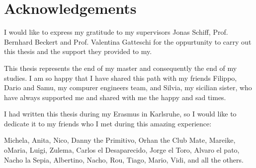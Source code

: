 \chapter* {Acknowledgements}
I would like to express my gratitude to my supervisors Jonas Schiff, Prof. Bernhard Beckert and Prof. Valentina Gatteschi
for the oppurtunity to carry out this thesis and the support they provided to my.

This thesis represents the end of my master and consequently the end of my studies. 
I am so happy that I have shared this path with my friends Filippo, Dario and Samu, my compurer engineers team, and Silvia, my sicilian sister, who have always supported me and shared with me the happy and sad times. 

I had written this thesis during my Erasmus in Karlsruhe, so I would like to dedicate it to my friends who I met during this amazing experience:

Michela, Anita, Nico,  Danny the Primitivo, Orhan the Club Mate, Mareike, oMaria, Luigi, Zulema, Carlos el Desaparecido, Jorge el Toro, Alvaro el pato, Nacho la Sepia, Albertino, Nacho, Rou, Tiago, Mario, Vidi, and all the others.
